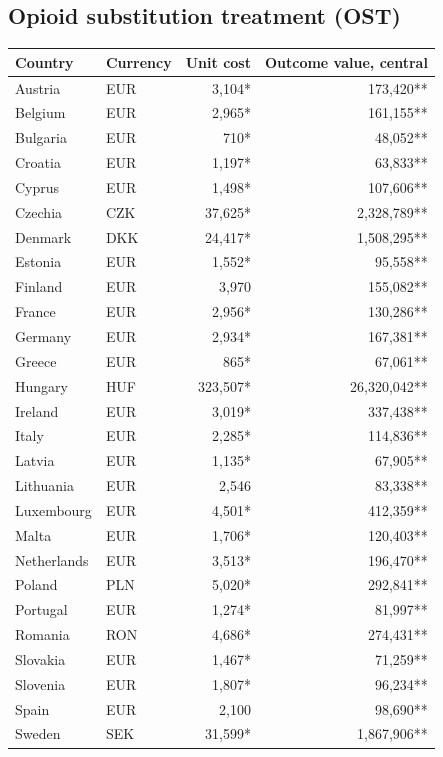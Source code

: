 \subsection*{Opioid substitution treatment (OST)}
\begin{longtable}{llrr}
\toprule
Country & Currency & Unit cost & Outcome value, central \\
\midrule
\endhead
Austria & EUR & 3,104* & 173,420** \\
Belgium & EUR & 2,965* & 161,155** \\
Bulgaria & EUR & 710* & 48,052** \\
Croatia & EUR & 1,197* & 63,833** \\
Cyprus & EUR & 1,498* & 107,606** \\
Czechia & CZK & 37,625* & 2,328,789** \\
Denmark & DKK & 24,417* & 1,508,295** \\
Estonia & EUR & 1,552* & 95,558** \\
Finland & EUR & 3,970 & 155,082** \\
France & EUR & 2,956* & 130,286** \\
Germany & EUR & 2,934* & 167,381** \\
Greece & EUR & 865* & 67,061** \\
Hungary & HUF & 323,507* & 26,320,042** \\
Ireland & EUR & 3,019* & 337,438** \\
Italy & EUR & 2,285* & 114,836** \\
Latvia & EUR & 1,135* & 67,905** \\
Lithuania & EUR & 2,546 & 83,338** \\
Luxembourg & EUR & 4,501* & 412,359** \\
Malta & EUR & 1,706* & 120,403** \\
Netherlands & EUR & 3,513* & 196,470** \\
Poland & PLN & 5,020* & 292,841** \\
Portugal & EUR & 1,274* & 81,997** \\
Romania & RON & 4,686* & 274,431** \\
Slovakia & EUR & 1,467* & 71,259** \\
Slovenia & EUR & 1,807* & 96,234** \\
Spain & EUR & 2,100 & 98,690** \\
Sweden & SEK & 31,599* & 1,867,906** \\
\bottomrule
\end{longtable}

